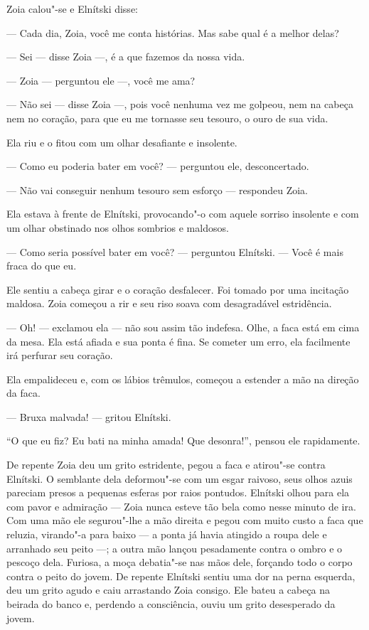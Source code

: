 Zoia calou"-se e Elnítski disse:

--- Cada dia, Zoia, você me conta histórias. Mas sabe qual é a melhor
delas?

--- Sei --- disse Zoia ---, é a que fazemos da nossa vida.

--- Zoia --- perguntou ele ---, você me ama?

--- Não sei --- disse Zoia ---, pois você nenhuma vez me golpeou, nem na
cabeça nem no coração, para que eu me tornasse seu tesouro, o ouro de
sua vida.

Ela riu e o fitou com um olhar desafiante e insolente.

--- Como eu poderia bater em você? --- perguntou ele, desconcertado.

--- Não vai conseguir nenhum tesouro sem esforço --- respondeu Zoia.

Ela estava à frente de Elnítski, provocando"-o com aquele sorriso
insolente e com um olhar obstinado nos olhos sombrios e maldosos.

--- Como seria possível bater em você? --- perguntou Elnítski. --- Você
é mais fraca do que eu.

Ele sentiu a cabeça girar e o coração desfalecer. Foi tomado por uma
incitação maldosa. Zoia começou a rir e seu riso soava com desagradável
estridência.

--- Oh! --- exclamou ela --- não sou assim tão indefesa. Olhe, a faca
está em cima da mesa. Ela está afiada e sua ponta é fina. Se cometer um
erro, ela facilmente irá perfurar seu coração.

Ela empalideceu e, com os lábios trêmulos, começou a estender a mão na
direção da faca.

--- Bruxa malvada! --- gritou Elnítski.


``O que eu fiz? Eu bati na minha amada! Que desonra!'', pensou ele
rapidamente.

De repente Zoia deu um grito estridente, pegou a faca e atirou"-se contra
Elnítski. O semblante dela deformou"-se com um esgar raivoso, seus olhos
azuis pareciam presos a pequenas esferas por raios pontudos. Elnítski
olhou para ela com pavor e admiração --- Zoia nunca esteve tão bela como
nesse minuto de ira. Com uma mão ele segurou"-lhe a mão direita e pegou com muito custo a faca que reluzia, virando"-a para baixo --- a
ponta já havia atingido a roupa dele e arranhado seu peito ---; a outra
mão lançou pesadamente contra o ombro e o pescoço dela. Furiosa, a
moça debatia"-se nas mãos dele, forçando todo o corpo contra o peito do
jovem. De repente Elnítski sentiu uma dor na perna esquerda, deu um
grito agudo e caiu arrastando Zoia consigo. Ele bateu a cabeça na
beirada do banco e, perdendo a consciência, ouviu um grito desesperado
da jovem.

